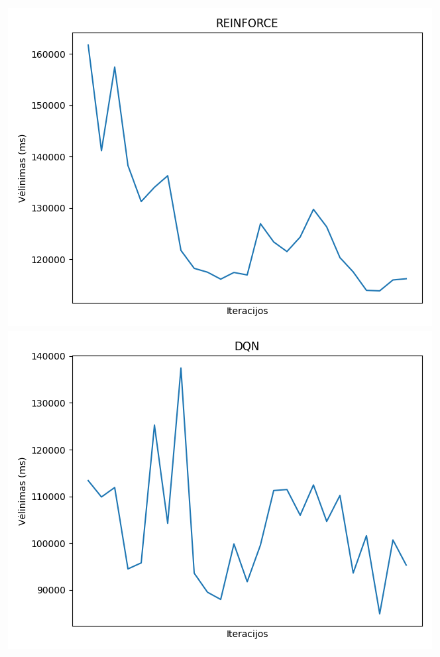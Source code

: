 \documentclass{VUMIFPSbakalaurinis}
\begin{document}
\begin{figure}[H]
    \centering
    \begin{minipage}[b]{0.4\textwidth}
        \includegraphics[width=\textwidth]{img/reinforce_100.png}
    \end{minipage}
    \hspace{100mm}
    \begin{minipage}[b]{0.4\textwidth}
        \includegraphics[width=\textwidth]{img/dqn_100.png}
    \end{minipage}
    \hspace{1mm}
    \begin{minipage}[b]{0.4\textwidth}

\end{minipage}
\end{figure}
\end{document}
